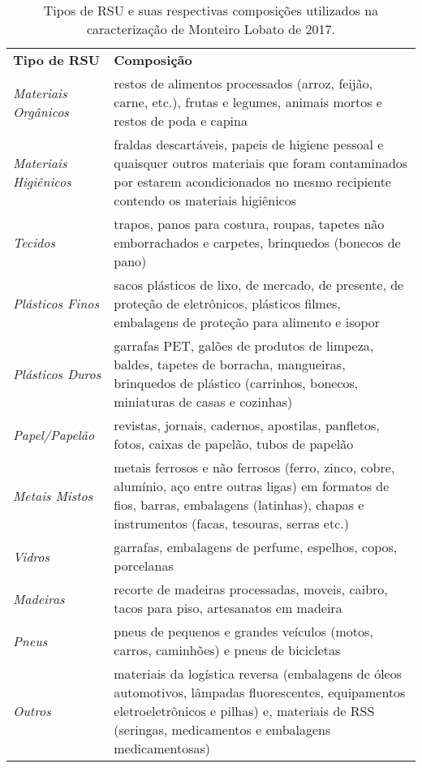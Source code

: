 	\begin{table}[htbp]
		\centering
		\caption{Tipos de RSU e suas respectivas composições utilizados na caracterização de Monteiro Lobato de 2017.}
		\begin{tabular}{P{2cm}|P{10cm}}
			 \textcolor[rgb]{ 1,  1,  1}{\textbf{Tipo de RSU}} & \textcolor[rgb]{ 1,  1,  1}{\textbf{Composição}} \\
			 \textit{Materiais Orgânicos} & restos de alimentos processados (arroz, feijão, carne, etc.), frutas e legumes, animais mortos e restos de poda e capina \\
			 \textit{Materiais Higiênicos} & fraldas descartáveis, papeis de higiene pessoal e quaisquer outros materiais que foram contaminados por estarem acondicionados no mesmo recipiente contendo os materiais higiênicos \\
			 \textit{Tecidos} & trapos, panos para costura, roupas, tapetes não emborrachados e carpetes, brinquedos (bonecos de pano) \\
			 \textit{Plásticos Finos} & sacos plásticos de lixo, de mercado, de presente, de proteção de eletrônicos, plásticos filmes, embalagens de proteção para alimento e isopor \\
			 \textit{Plásticos Duros} & garrafas PET, galões de produtos de limpeza, baldes, tapetes de borracha, mangueiras, brinquedos de plástico (carrinhos, bonecos, miniaturas de casas e cozinhas) \\
			 \textit{Papel/Papelão} & revistas, jornais, cadernos, apostilas, panfletos, fotos, caixas de papelão, tubos de papelão \\
			 \textit{Metais Mistos} & metais ferrosos e não ferrosos (ferro, zinco, cobre, alumínio, aço entre outras ligas) em formatos de fios, barras, embalagens (latinhas), chapas e instrumentos (facas, tesouras, serras etc.) \\
			 \textit{Vidros} & garrafas, embalagens de perfume, espelhos, copos, porcelanas \\
			 \textit{Madeiras} & recorte de madeiras processadas, moveis, caibro, tacos para piso, artesanatos em madeira \\
			 \textit{Pneus} & pneus de pequenos e grandes veículos (motos, carros, caminhões) e pneus de bicicletas \\
			 \textit{Outros} & materiais da logística reversa (embalagens de óleos automotivos, lâmpadas fluorescentes, equipamentos eletroeletrônicos e pilhas) e, materiais de RSS (seringas, medicamentos e embalagens medicamentosas) \\
		\end{tabular}%
		\label{tab:tipo_rsu}%
	\end{table}%